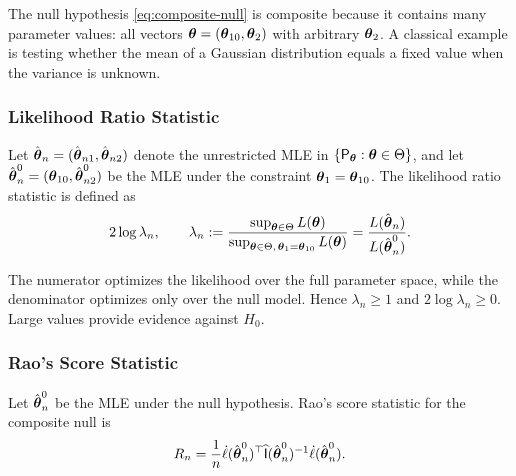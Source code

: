 \begin{remark}
The null hypothesis \eqref{eq:composite-null} is composite because it contains many parameter values:
all vectors \(\boldsymbol{\theta} = (\boldsymbol{\theta}_{10}, \boldsymbol{\theta}_2)\) with arbitrary \(\boldsymbol{\theta}_2\).
A classical example is testing whether the mean of a Gaussian distribution equals a fixed value
when the variance is unknown.
\end{remark}

\subsubsection{Likelihood Ratio Statistic}

\begin{definition}\label{def:lr-composite}
Let \(\hat{\boldsymbol{\theta}}_n = (\hat{\boldsymbol{\theta}}_{n1}, \hat{\boldsymbol{\theta}}_{n2})\) denote the unrestricted MLE in
\(\{\mathsf{P}_{\boldsymbol{\theta}} : \boldsymbol{\theta} \in \Theta\}\),
and let
\(\hat{\boldsymbol{\theta}}_n^0 = (\boldsymbol{\theta}_{10}, \hat{\boldsymbol{\theta}}_{n2}^0)\)
be the MLE under the constraint \(\boldsymbol{\theta}_1 = \boldsymbol{\theta}_{10}\).
The likelihood ratio statistic is defined as
\begin{equation*}\label{eq:lr-composite}
2 \log \lambda_n,
\qquad
\lambda_n
:=
\frac{\sup_{\boldsymbol{\theta} \in \Theta} L(\boldsymbol{\theta})}
{\sup_{\boldsymbol{\theta} \in \Theta,\, \boldsymbol{\theta}_1 = \boldsymbol{\theta}_{10}} L(\boldsymbol{\theta})}
=
\frac{L(\hat{\boldsymbol{\theta}}_n)}{L(\hat{\boldsymbol{\theta}}_n^0)}.
\end{equation*}
\end{definition}

\begin{remark}
The numerator optimizes the likelihood over the full parameter space,
while the denominator optimizes only over the null model.
Hence \(\lambda_n \geq 1\) and \(2 \log \lambda_n \geq 0\).
Large values provide evidence against \(H_0\).
\end{remark}

\subsubsection{Rao's Score Statistic}

\begin{definition}\label{def:rao-composite}
Let \(\hat{\boldsymbol{\theta}}_n^0\) be the MLE under the null hypothesis.
Rao's score statistic for the composite null is
\begin{equation}\label{eq:rao-composite}
R_n
=
\frac{1}{n}
\dot{\ell}(\hat{\boldsymbol{\theta}}_n^0)^{\top}
\widehat{\mathsf{I}}(\hat{\boldsymbol{\theta}}_n^0)^{-1}
\dot{\ell}(\hat{\boldsymbol{\theta}}_n^0).
\end{equation}
\end{definition}

